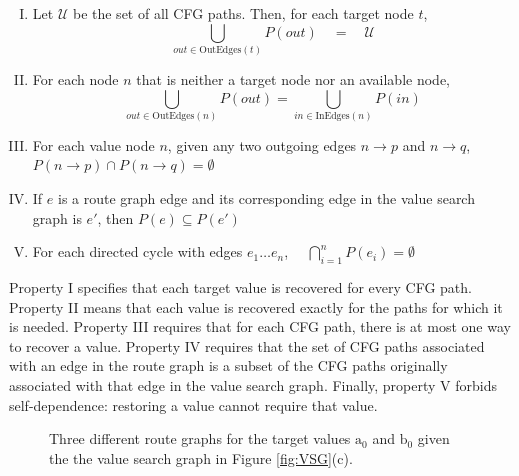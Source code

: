 \begin{enumerate}[I)]

\item Let $\mathcal{U}$ be the set of all CFG paths. Then, for each target node $t$, 
	$$\bigcup_{\mathit{out} \in \text{OutEdges}(t)}P(\mathit{out}) \quad = \quad \mathcal{U} $$ 
	\label{rg-property-1}

\item For each node $n$ that is neither a target node nor an available node,
	$$\bigcup_{\mathit{out} \in \text{OutEdges} (n)} P(out) = \bigcup_{\mathit{in} \in \text{InEdges} (n)}P( \mathit{in} )$$ 

\item For each value node $n$, given any two outgoing edges $n\to p$ and $n\to q$, $P(n\to p) \cap P(n\to q) = \emptyset$ 

\item If $e$ is a route graph edge and its corresponding edge in the value search graph is $e'$, then $P(e) \subseteq P(e')$
	\label{rg-property-4}

\item For each directed cycle with edges $e_1 \dots e_n$,  $\quad \bigcap_{i=1}^n{P(e_{i})} = \emptyset$
	\label{rg-property-5}

\end{enumerate}

Property I specifies that each target value is recovered for every CFG path. 
Property II means that each value is recovered exactly for the paths for which it is needed.
Property III requires that for each CFG path, there is at most one way to recover a value. 
Property IV requires that the set of CFG paths associated with an edge in the route graph is a subset of the CFG paths originally associated with that edge in the value search graph. Finally, property V forbids self-dependence: restoring a value cannot require that value. 

\begin{figure}[htb]
\caption{Three different route graphs for the target values $\text{a}_{\text{0}}$ and $\text{b}_{\text{0}}$ given the the value search graph in Figure \ref{fig:VSG}(c). %
}
\label{fig:RG}
\end{figure}

